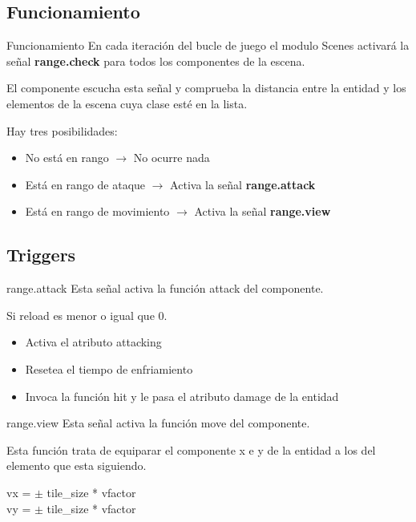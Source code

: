 \documentclass{beamer}
\begin{document}
\subsection{Funcionamiento}

\begin{frame}{Funcionamiento}
En cada iteración del bucle de juego el modulo Scenes activará la señal
\textbf{range.check} para todos los componentes de la escena.

\medskip

El componente escucha esta señal y comprueba la distancia entre la entidad y
los elementos de la escena cuya clase esté en la lista.

\medskip

Hay tres posibilidades:
\begin{itemize}
  \item No está en rango $\rightarrow$ No ocurre nada
  \item Está en rango de ataque $\rightarrow$ Activa la señal
    \textbf{range.attack}
  \item Está en rango de movimiento $\rightarrow$ Activa la señal
    \textbf{range.view}
\end{itemize}
\end{frame}

\subsection{Triggers}

\begin{frame}{range.attack}
Esta señal activa la función attack del componente.

\medskip

Si reload es menor o igual que 0.
\begin{itemize}
  \item Activa el atributo attacking
  \item Resetea el tiempo de enfriamiento
  \item Invoca la función hit y le pasa el atributo damage de la entidad
\end{itemize}
\end{frame}

\begin{frame}{range.view}
Esta señal activa la función move del componente.

\medskip

Esta función trata de equiparar el componente x e y de la entidad a los del
elemento que esta siguiendo.

\begin{center}
  vx = $\pm$ tile\_size * vfactor\\
  vy = $\pm$ tile\_size * vfactor
\end{center}
\end{frame}
\end{document}
